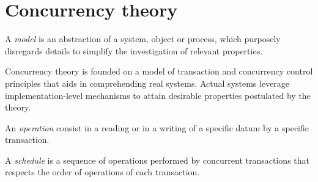 \section{Concurrency theory}

\begin{definition}
    A \emph{model} is an abstraction of a system, object or process, which purposely disregards details to simplify the investigation of relevant properties. 
\end{definition}
Concurrency theory is founded on a model of transaction and concurrency control principles that aids in comprehending real systems.
Actual systems leverage implementation-level mechanisms to attain desirable properties postulated by the theory.
\begin{definition}
    An \emph{operation} consist in a reading or in a writing of a specific datum by a specific transaction. 

    A \emph{schedule} is a sequence of operations performed by concurrent transactions that respects the order of operations of each transaction. 
\end{definition}

